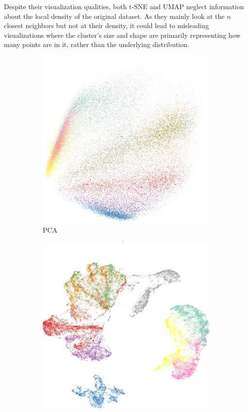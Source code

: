 Despite their visualization qualities, both t-SNE and UMAP neglect information about the local density of the original dataset. As they mainly look at the $n$ closest neighbors but not at their density, it could lead to misleading visualizations where the cluster's size and shape are primarily representing how many points are in it, rather than the underlying distribution.
\begin{figure}[ht]
    \centering
    \begin{subfigure}[b]{0.33\textwidth}
        \centering
        \includegraphics[width=\textwidth]{img/fashion-pca.png}
        \caption{PCA}
        \label{fig:fas-pca}
    \end{subfigure}
    \begin{subfigure}[b]{0.3\textwidth}
        \centering
        \includegraphics[width=\textwidth]{img/fashion-umap.png}

\end{subfigure}
\end{figure}
